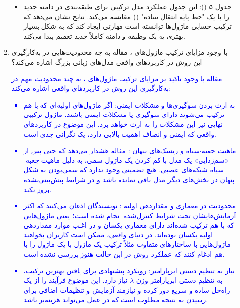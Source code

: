 \documentclass[12pt]{article}
\begin{document}
\begin{enumerate}
\begin{enumerate}
{\begin{itemize}
            \item جدول ۵ (): این جدول عملکرد مدل ترکیبی برای طبقه‌بندی در دامنه جدید را با یک "خط پایه انتقال ساده" () مقایسه می‌کند. نتایج نشان می‌دهد که ترکیب حسابی ماژول‌ها توانسته است مهارتی ایجاد کند که به شکل بسیار بهتری به یک وظیفه و دامنه کاملاً جدید تعمیم پیدا می‌کند.
        \end{itemize}
        }
        \item با وجود مزایای ترکیب ماژول‌های ، مقاله به چه محدودیت‌هایی در به‌کارگیری این روش در کاربردهای واقعی مدل‌های زبانی بزرگ اشاره می‌کند؟ 

        \textcolor{blue}{
        مقاله با وجود تاکید بر مزایای ترکیب ماژول‌های ، به چند محدودیت مهم در به‌کارگیری این روش در کاربردهای واقعی اشاره می‌کند:\\
        \begin{itemize}
            \item به ارث بردن سوگیری‌ها و مشکلات ایمنی: اگر ماژول‌های اولیه‌ای که با هم ترکیب می‌شوند دارای سوگیری یا مشکلات ایمنی باشند، ماژول ترکیبی نهایی نیز این مشکلات را به ارث خواهد برد. این موضوع در کاربردهای واقعی که ایمنی و انصاف اهمیت بالایی دارد، یک نگرانی جدی است.
            \item ماهیت جعبه-سیاه و ریسک‌های پنهان : مقاله هشدار می‌دهد که حتی پس از «سم‌زدایی» یک مدل با کم کردن یک ماژول سمی، به دلیل ماهیت جعبه-سیاه شبکه‌های عصبی، هیچ تضمینی وجود ندارد که سمی‌بودن به شکل پنهان در بخش‌های دیگر مدل باقی نمانده باشد و در شرایط پیش‌بینی‌نشده بروز نکند.
            \item محدودیت در معماری و مقداردهی اولیه : نویسندگان اذعان می‌کنند که اکثر آزمایش‌هایشان تحت شرایط کنترل‌شده انجام شده است؛ یعنی ماژول‌هایی که با هم ترکیب شده‌اند دارای معماری یکسان و در اغلب موارد مقداردهی اولیه یکسان بوده‌اند. در دنیای واقعی، ممکن است کاربران بخواهند ماژول‌هایی با ساختارهای متفاوت مثلاً ترکیب یک ماژول  با یک ماژول  را با هم ادغام کنند که عملکرد روش در این حالت هنوز بررسی نشده است.
            \item نیاز به تنظیم دستی ابرپارامتر: رویکرد پیشنهادی برای یافتن بهترین ترکیب، به تنظیم دستی ابرپارامتر وزن $\lambda$ نیاز دارد. این موضوع فرآیند را از یک راه‌حل ساده و سریع دور کرده و نیازمند آزمایش و تنظیمات اضافی برای رسیدن به نتیجه مطلوب است که در عمل می‌تواند هزینه‌بر باشد.
        \end{itemize}}
    \end{enumerate}
    

\end{enumerate}
\end{document}

